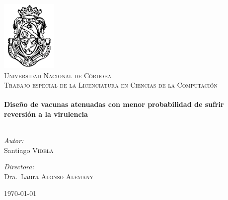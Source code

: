 \begin{titlepage}

\begin{center}

\includegraphics[scale=0.5]{famaf}\\[1cm]    

\textsc{\LARGE Universidad Nacional de C\'ordoba}\\[1.5cm]

\textsc{\Large Trabajo especial de la Licenciatura en Ciencias de la
Computaci\'on}\\[0.5cm]


\HRule \\[0.4cm]
{ \huge \bfseries Dise\~no de vacunas atenuadas con menor probabilidad de
sufrir reversi\'on a la virulencia}\\[0.4cm]

\HRule \\[1.5cm]

\begin{minipage}{0.4\textwidth}
\begin{flushleft} \large
\emph{Autor:}\\
Santiago \textsc{Videla}
\end{flushleft}
\end{minipage}
\begin{minipage}{0.4\textwidth}
\begin{flushright} \large
\emph{Directora:} \\
Dra.~Laura \textsc{Alonso Alemany}
\end{flushright}
\end{minipage}

\vfill


{\large \today} 
\end{center}





\end{titlepage}